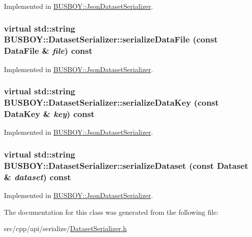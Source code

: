 Implemented in \hyperlink{classBUSBOY_1_1JsonDatasetSerializer_a2e3d76a4ee7e7e3afcfef509b3e8a289}{BUSBOY::JsonDatasetSerializer}.\hypertarget{classBUSBOY_1_1DatasetSerializer_ab9b56a991074a0abb0ab94d2a409c6bf}{
\subsubsection[{serializeDataFile}]{\setlength{\rightskip}{0pt plus 5cm}virtual std::string BUSBOY::DatasetSerializer::serializeDataFile (const {\bf DataFile} \& {\em file}) const}}
\label{classBUSBOY_1_1DatasetSerializer_ab9b56a991074a0abb0ab94d2a409c6bf}


Implemented in \hyperlink{classBUSBOY_1_1JsonDatasetSerializer_adc5513d517be053ec289589702f5a599}{BUSBOY::JsonDatasetSerializer}.\hypertarget{classBUSBOY_1_1DatasetSerializer_ae6feb1fca82e563d82a07722b4cc1999}{
\subsubsection[{serializeDataKey}]{\setlength{\rightskip}{0pt plus 5cm}virtual std::string BUSBOY::DatasetSerializer::serializeDataKey (const {\bf DataKey} \& {\em key}) const}}
\label{classBUSBOY_1_1DatasetSerializer_ae6feb1fca82e563d82a07722b4cc1999}


Implemented in \hyperlink{classBUSBOY_1_1JsonDatasetSerializer_ac4888a2de49c410d35b77e5d4d6ed04a}{BUSBOY::JsonDatasetSerializer}.\hypertarget{classBUSBOY_1_1DatasetSerializer_a1c949eb74f1b6277361237633c0f1343}{
\subsubsection[{serializeDataset}]{\setlength{\rightskip}{0pt plus 5cm}virtual std::string BUSBOY::DatasetSerializer::serializeDataset (const {\bf Dataset} \& {\em dataset}) const}}
\label{classBUSBOY_1_1DatasetSerializer_a1c949eb74f1b6277361237633c0f1343}


Implemented in \hyperlink{classBUSBOY_1_1JsonDatasetSerializer_add2bc8fa98d80ed23fd782af66ad9ef2}{BUSBOY::JsonDatasetSerializer}.

The documentation for this class was generated from the following file:\begin{DoxyCompactItemize}
\item 
src/cpp/api/serialize/\hyperlink{DatasetSerializer_8h}{DatasetSerializer.h}\end{DoxyCompactItemize}
